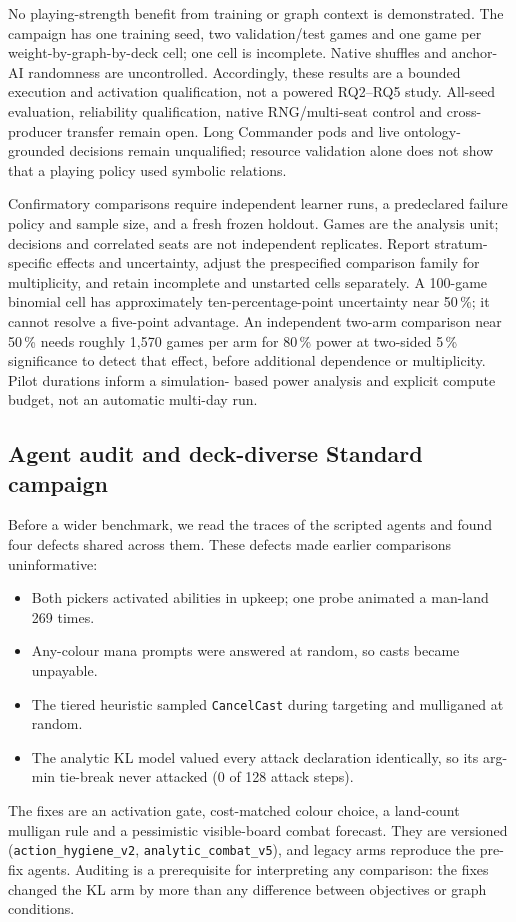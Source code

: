 \documentclass[11pt,a4paper]{article}
\theoremstyle{definition}
\theoremstyle{plain}
\begin{document}
No playing-strength benefit from training or graph context is demonstrated.
The campaign has one training seed, two validation/test games and one game per
weight-by-graph-by-deck cell; one cell is incomplete. Native shuffles and
anchor-AI randomness are uncontrolled. Accordingly, these results are a
bounded execution and activation qualification, not a powered RQ2--RQ5 study.
All-seed evaluation, reliability qualification, native RNG/multi-seat control
and cross-producer transfer remain open. Long Commander pods and live
ontology-grounded decisions remain unqualified; resource validation alone does
not show that a playing policy used symbolic relations.

Confirmatory comparisons require independent learner runs, a predeclared
failure policy and sample size, and a fresh frozen holdout. Games are the
analysis unit; decisions and correlated seats are not independent replicates.
Report stratum-specific effects and uncertainty, adjust the prespecified
comparison family for multiplicity, and retain incomplete and unstarted cells
separately. A 100-game binomial cell has approximately ten-percentage-point
uncertainty near 50\,\%; it cannot resolve a five-point advantage. An
independent two-arm comparison near 50\,\% needs roughly 1,570 games per arm
for 80\,\% power at two-sided 5\,\% significance to detect that effect, before
additional dependence or multiplicity. Pilot durations inform a simulation-
based power analysis and explicit compute budget, not an automatic multi-day
run.

\subsection{Agent audit and deck-diverse Standard campaign}
\label{sec:standard-campaign}
Before a wider benchmark, we read the traces of the scripted agents and
found four defects shared across them. These defects made earlier
comparisons uninformative:
\begin{itemize}[leftmargin=1.2em, itemsep=1pt]
  \item Both pickers activated abilities in upkeep; one probe animated a
        man-land 269 times.
  \item Any-colour mana prompts were answered at random, so casts became
        unpayable.
  \item The tiered heuristic sampled \texttt{CancelCast} during targeting and
        mulliganed at random.
  \item The analytic KL model valued every attack declaration identically,
        so its arg-min tie-break never attacked (0 of 128 attack steps).
\end{itemize}
The fixes are an activation gate, cost-matched colour choice, a land-count
mulligan rule and a pessimistic visible-board combat forecast. They are
versioned (\texttt{action\_hygiene\_v2}, \texttt{analytic\_combat\_v5}), and
legacy arms reproduce the pre-fix agents. Auditing is a prerequisite for
interpreting any comparison: the fixes changed the KL arm by more than any
difference between objectives or graph conditions.
\end{document}
